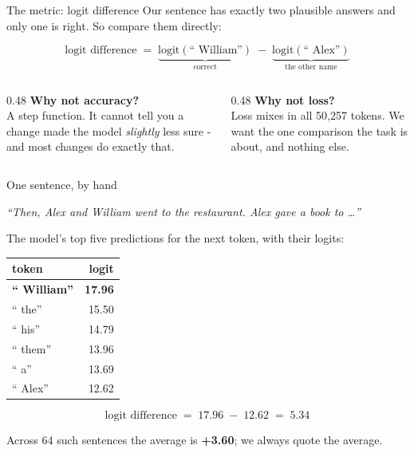 \documentclass[aspectratio=169]{beamer}
\newcommand{\promptbox}[1]{%
  \begin{center}
  \begin{tcolorbox}[colback=lightbg, colframe=gray, boxrule=0.5pt, arc=2pt, width=0.88\textwidth]
    \centering\textit{#1}
  \end{tcolorbox}
  \end{center}}
\begin{document}
\begin{frame}{The metric: logit difference}
  \vspace{0.7em}
  Our sentence has exactly two plausible answers and only one is right. So compare them
  directly:

  \vspace{0.7em}
  \[
    \text{logit difference} \;=\;
      \underbrace{\text{logit}(\text{`` William''})}_{\text{correct}} \;-\;
      \underbrace{\text{logit}(\text{`` Alex''})}_{\text{the other name}}
  \]

  \vspace{1.0em}
  \begin{columns}[T]
    \begin{column}{0.48\textwidth}
      \textbf{Why not accuracy?}\\[0.3em]
      \small A step function. It cannot tell you a change made the model \emph{slightly} less
      sure - and most changes do exactly that.
    \end{column}
    \begin{column}{0.48\textwidth}
      \textbf{Why not loss?}\\[0.3em]
      \small Loss mixes in all 50{,}257 tokens. We want the one comparison the task is about,
      and nothing else.
    \end{column}
  \end{columns}
\end{frame}

\begin{frame}{One sentence, by hand}
  \vspace{0.5em}
  \promptbox{``Then, Alex and William went to the restaurant. Alex gave a book to \ldots''}

  \vspace{0.2em}
  The model's top five predictions for the next token, with their logits:

  \vspace{0.4em}
  \begin{center}
  \small
  \begin{tabular}{@{}lr@{}}
    \toprule
    \textbf{token} & \textbf{logit}\\
    \midrule
    \textcolor{paramgreen}{\textbf{`` William''}} & \textcolor{paramgreen}{\textbf{17.96}}\\
    `` the'' & 15.50\\
    `` his'' & 14.79\\
    `` them'' & 13.96\\
    `` a'' & 13.69\\
    \midrule
    \textcolor{armred}{`` Alex''} & \textcolor{armred}{12.62}\\
    \bottomrule
  \end{tabular}
  \end{center}

  \vspace{0.1em}
  \[
    \text{logit difference} \;=\; 17.96 \;-\; 12.62 \;=\; \mathbf{5.34}
  \]

  \vspace{-0.3em}
  {\footnotesize Across 64 such sentences the average is \textbf{+3.60}; we always quote the
  average.}
\end{frame}
\end{document}
